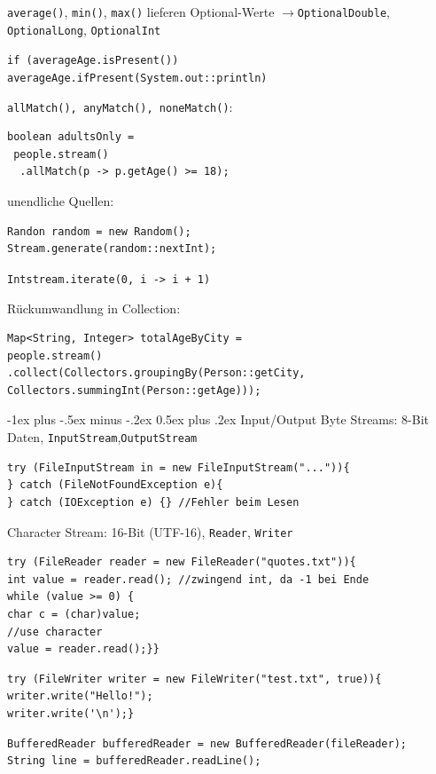 \documentclass[10pt,landscape,a4paper]{article}
\makeatletter
\renewcommand{\section}{\@startsection{section}{1}{0mm}%
                                {-1ex plus -.5ex minus -.2ex}%
                                {0.5ex plus .2ex}%
                                {\normalfont\large\bfseries}}
\newcommand{\java}[1]{\texttt{#1}}
\makeatother
\begin{document}
\begin{multicols*}{3}
\java{average()}, \java{min()}, \java{max()} lieferen Optional-Werte 
$\rightarrow$\java{OptionalDouble}, \java{OptionalLong}, \java{OptionalInt}

\java{if (averageAge.isPresent())}\\ 
\java{averageAge.ifPresent(System.out::println)}

\java{allMatch(), anyMatch(), noneMatch()}:
\begin{verbatim}
boolean adultsOnly =
 people.stream()
  .allMatch(p -> p.getAge() >= 18);
\end{verbatim}

unendliche Quellen:
\begin{verbatim}
Randon random = new Random();
Stream.generate(random::nextInt);
\end{verbatim}

\java{Intstream.iterate(0, i -> i + 1)}

Rückumwandlung in Collection:
\begin{verbatim}
Map<String, Integer> totalAgeByCity =
people.stream()
.collect(Collectors.groupingBy(Person::getCity,
Collectors.summingInt(Person::getAge)));
\end{verbatim}

\section{Input/Output}
Byte Streams: 8-Bit Daten, \java{InputStream},\java{OutputStream}\\
\begin{verbatim}
try (FileInputStream in = new FileInputStream("...")){
} catch (FileNotFoundException e){
} catch (IOException e) {} //Fehler beim Lesen
\end{verbatim}
Character Stream: 16-Bit (UTF-16), \java{Reader}, \java{Writer}

\begin{verbatim}
try (FileReader reader = new FileReader("quotes.txt")){
int value = reader.read(); //zwingend int, da -1 bei Ende
while (value >= 0) {
char c = (char)value;
//use character
value = reader.read();}}
\end{verbatim}

\begin{verbatim}
try (FileWriter writer = new FileWriter("test.txt", true)){
writer.write("Hello!");
writer.write('\n');}
\end{verbatim}

\begin{verbatim}
BufferedReader bufferedReader = new BufferedReader(fileReader);
String line = bufferedReader.readLine();
\end{verbatim}


\end{multicols*}
\end{document}
